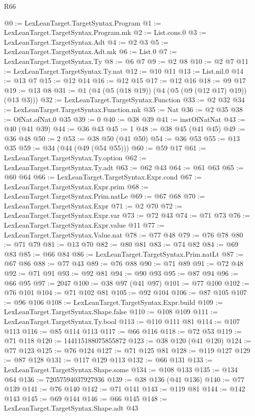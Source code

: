 \begin{lexlean}{R66}
\begin{coremodule}
@0 := LexLeanTarget.TargetSyntax.Program
@1 := LexLeanTarget.TargetSyntax.Program.mk
@2 := List.cons.{0}
@3 := LexLeanTarget.TargetSyntax.Adt
@4 := @2 @3
@5 := LexLeanTarget.TargetSyntax.Adt.mk
@6 := List.{0}
@7 := LexLeanTarget.TargetSyntax.Ty
@8 := @6 @7
@9 := @2 @8
@10 := @2 @7
@11 := LexLeanTarget.TargetSyntax.Ty.nat
@12 := @10 @11
@13 := List.nil.{0}
@14 := @13 @7
@15 := @12 @14
@16 := @12 @15
@17 := @12 @16
@18 := @9 @17
@19 := @13 @8
@31 := @1 (@4 (@5 (@18 @19)) (@4 (@5 (@9 (@12 @17) @19)) (@13 @3)))
@32 := LexLeanTarget.TargetSyntax.Function
@33 := @2 @32
@34 := LexLeanTarget.TargetSyntax.Function.mk
@35 := Nat
@36 := @2 @35
@38 := OfNat.ofNat.{0} @35
@39 := 0
@40 := @38 @39
@41 := instOfNatNat
@43 := @40 (@41 @39)
@44 := @36 @43
@45 := 1
@48 := @38 @45 (@41 @45)
@49 := @36 @48
@50 := 2
@53 := @38 @50 (@41 @50)
@54 := @36 @53
@55 := @13 @35
@59 := @34 (@44 (@49 (@54 @55)))
@60 := @59 @17
@61 := LexLeanTarget.TargetSyntax.Ty.option
@62 := LexLeanTarget.TargetSyntax.Ty.adt
@63 := @62 @43
@64 := @61 @63
@65 := @60 @64
@66 := LexLeanTarget.TargetSyntax.Expr.cond
@67 := LexLeanTarget.TargetSyntax.Expr.prim
@68 := LexLeanTarget.TargetSyntax.Prim.natLe
@69 := @67 @68
@70 := LexLeanTarget.TargetSyntax.Expr
@71 := @2 @70
@72 := LexLeanTarget.TargetSyntax.Expr.var
@73 := @72 @43
@74 := @71 @73
@76 := LexLeanTarget.TargetSyntax.Expr.value @11
@77 := LexLeanTarget.TargetSyntax.Value.nat
@78 := @77 @48
@79 := @76 @78
@80 := @71 @79
@81 := @13 @70
@82 := @80 @81
@83 := @74 @82
@84 := @69 @83
@85 := @66 @84
@86 := LexLeanTarget.TargetSyntax.Prim.natLt
@87 := @67 @86
@88 := @77 @43
@89 := @76 @88
@90 := @71 @89
@91 := @72 @48
@92 := @71 @91
@93 := @92 @81
@94 := @90 @93
@95 := @87 @94
@96 := @66 @95
@97 := 2047
@100 := @38 @97 (@41 @97)
@101 := @77 @100
@102 := @76 @101
@104 := @71 @102 @81
@105 := @92 @104
@106 := @87 @105
@107 := @96 @106
@108 := LexLeanTarget.TargetSyntax.Expr.build
@109 := LexLeanTarget.TargetSyntax.Shape.false
@110 := @108 @109
@111 := LexLeanTarget.TargetSyntax.Ty.bool
@113 := @110 @111 @81
@114 := @107 @113
@116 := @85 @114 @113
@117 := @66 @116
@118 := @72 @53
@119 := @71 @118
@120 := 144115188075855872
@123 := @38 @120 (@41 @120)
@124 := @77 @123
@125 := @76 @124
@127 := @71 @125 @81
@128 := @119 @127
@129 := @87 @128
@131 := @117 @129 @113
@132 := @66 @131
@133 := LexLeanTarget.TargetSyntax.Shape.some
@134 := @108 @133
@135 := @134 @64
@136 := 72057594037927936
@139 := @38 @136 (@41 @136)
@140 := @77 @139
@141 := @76 @140
@142 := @71 @141
@143 := @119 @81
@144 := @142 @143
@145 := @69 @144
@146 := @66 @145
@148 := LexLeanTarget.TargetSyntax.Shape.adt @43

\end{coremodule}
\end{lexlean}
